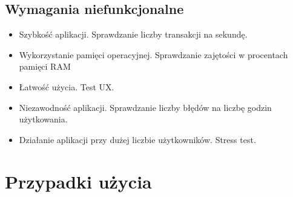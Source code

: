 \documentclass[12pt]{article}
\begin{document}
\subsection{Wymagania niefunkcjonalne}
\begin{itemize}
\item Szybkość aplikacji. Sprawdzanie liczby transakcji na sekundę.
\item Wykorzystanie pamięci operacyjnej. Sprawdzanie zajętości w procentach pamięci RAM	
\item Łatwość użycia. Test UX.
\item Niezawodność aplikacji. Sprawdzanie liczby błędów na liczbę godzin użytkowania.
\item Działanie aplikacji przy dużej liczbie użytkowników. Stress test.
\end{itemize}
\section*{Przypadki użycia}
\end{document}
